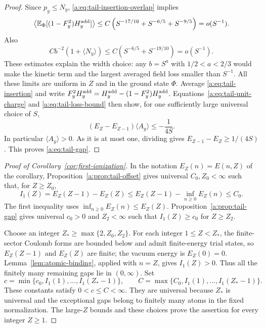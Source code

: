 \begin{proof}
Since $p_y\le N_y$, \eqref{a:eq:tail-insertion-overlap} implies
\[
 \left\langle\mathbb E_\Phi[(1-F_y^2)H_y^{\rm add}]\right\rangle
 \le C\left(S^{-17/10}+S^{-6/5}+S^{-9/5}\right)
 =o(S^{-1}).
\]
Also
\[
 Cb^{-2}(1+\langle N_y\rangle)
 \le C(S^{-6/5}+S^{-19/10})=o(S^{-1}).
\]
These estimates explain the width choice: any $b=S^a$ with
$1/2<a<2/3$ would make the kinetic term and the largest averaged
field loss smaller than $S^{-1}$.
All these limits are uniform in $Z$ and in the ground state $\Phi$.
Average \eqref{a:eq:tail-insertion} and write
$F_y^2H_y^{\rm add}=H_y^{\rm add}-(1-F_y^2)H_y^{\rm add}$.
Equations~\eqref{a:eq:tail-unit-charge} and \eqref{a:eq:tail-loss-bound}
then show, for one sufficiently large universal choice of $S$,
\[
 (E_Z-E_{Z-1})\langle A_y\rangle\le-\frac1{4S}.
\]
In particular $\langle A_y\rangle>0$.  As it is at most one, dividing
gives $E_{Z-1}-E_Z\ge1/(4S)$.  This proves
\eqref{a:eq:tail-gap}.
\end{proof}

\begin{proof}[Proof of Corollary~\ref{cor:first-ionization}]
In the notation $E_Z(n)=E(n,Z)$ of the corollary,
Proposition~\ref{a:prop:tail-offset} gives universal $C_0,Z_0<\infty$
such that, for $Z\ge Z_0$,
\[
 I_1(Z)=E_Z(Z-1)-E_Z(Z)
 \le E_Z(Z-1)-\inf_{n\ge0}E_Z(n)\le C_0.
\]
The first inequality uses $\inf_{n\ge0}E_Z(n)\le E_Z(Z)$.
Proposition~\ref{a:prop:tail-gap} gives universal $c_0>0$ and
$Z_2<\infty$ such that $I_1(Z)\ge c_0$ for $Z\ge Z_2$.

Choose an integer $Z_*\ge\max\{2,Z_0,Z_2\}$. For each integer
$1\le Z<Z_*$, the finite-sector Coulomb forms are bounded below and admit
finite-energy trial states, so $E_Z(Z-1)$ and $E_Z(Z)$ are finite; the
vacuum energy is $E_Z(0)=0$. Lemma~\ref{lem:atomic-binding}, applied with
$n=Z$, gives $I_1(Z)>0$. Thus all the finitely many remaining gaps lie
in $(0,\infty)$. Set
\[
 c=\min\{c_0,I_1(1),\ldots,I_1(Z_*-1)\},
 \qquad
 C=\max\{C_0,I_1(1),\ldots,I_1(Z_*-1)\}.
\]
These constants satisfy $0<c\le C<\infty$. They are universal because
$Z_*$ is universal and the exceptional gaps belong to finitely many atoms
in the fixed normalization. The large-$Z$ bounds and these choices prove
the assertion for every integer $Z\ge1$.
\end{proof}
